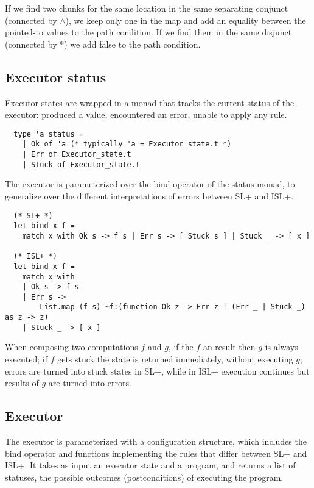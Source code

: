 \documentclass[parskip=half]{scrartcl}
\begin{document}
If we find two chunks for the same location in the same separating conjunct (\ie connected by \(\wedge\)), we keep only one in the  map and add an equality between the pointed-to values to the path condition. If we find them in the same disjunct (connected by \(\ast\)) we add false to the path condition.

\subsection{Executor status}

Executor states are wrapped in a monad that tracks the current status of the executor: produced a value, encountered an error, unable to apply any rule.

\begin{verbatim}
  type 'a status =
    | Ok of 'a (* typically 'a = Executor_state.t *)
    | Err of Executor_state.t
    | Stuck of Executor_state.t
\end{verbatim}

The executor is parameterized over the bind operator of the status monad, to generalize over the different interpretations of errors between SL+ and ISL+.

\begin{verbatim}
  (* SL+ *)
  let bind x f =
    match x with Ok s -> f s | Err s -> [ Stuck s ] | Stuck _ -> [ x ]

  (* ISL+ *)
  let bind x f =
    match x with
    | Ok s -> f s
    | Err s ->
        List.map (f s) ~f:(function Ok z -> Err z | (Err _ | Stuck _) as z -> z)
    | Stuck _ -> [ x ]
\end{verbatim}

When composing two computations \(f\) and \(g\), if the \(f\) an  result then \(g\) is always executed; if \(f\) gets stuck the state is returned immediately, without executing \(g\); errors are turned into stuck states in SL+, while in ISL+ execution continues but  results of \(g\) are turned into errors.

\subsection{Executor}

The executor is parameterized with a configuration structure, which includes the bind operator and functions implementing the rules that differ between SL+ and ISL+. It takes as input an executor state and a program, and returns a list of statuses, the possible outcomes (postconditions) of executing the program.
\end{document}
